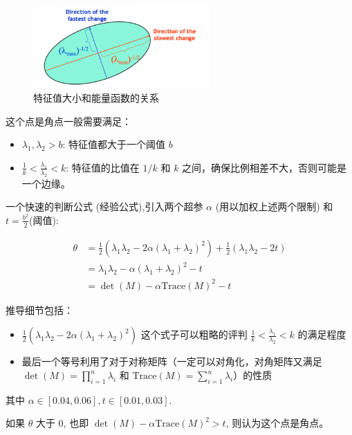 \newpage

\begin{figure}[htbp]
    \centering
    \includegraphics[width=0.6\textwidth]{figures/corner_energy.png}
    \caption{特征值大小和能量函数的关系}
\end{figure}

\begin{proposition}

这个点是角点一般需要满足：

\begin{itemize}
    \item $\lambda_1, \lambda_2>b$: 特征值都大于一个阈值 $b$
    \item $\frac{1}{k}<\frac{\lambda_1}{\lambda_2}<k$: 特征值的比值在 $1/k$ 和 $k$ 之间，确保比例相差不大，否则可能是一个边缘。
\end{itemize}

一个快速的判断公式 (经验公式),引入两个超参 $\alpha$ (用以加权上述两个限制) 和 $t = \frac{b^2}{2}$(阈值):

\begin{equation}
\begin{aligned}
\theta&=\frac 12(\lambda_1\lambda_2-2\alpha(\lambda_1+\lambda_2)^2)+\frac12(\lambda_1\lambda_2-2t)\\
&=\lambda_1\lambda_2-\alpha(\lambda_1+\lambda_2)^2-t\\
&=\det(M)-\alpha\text{Trace}(M)^2-t
\end{aligned}
\end{equation}

推导细节包括：

\begin{itemize}
    \item $\frac 12(\lambda_1\lambda_2-2\alpha(\lambda_1+\lambda_2)^2)$ 这个式子可以粗略的评判 $\frac{1}{k}<\frac{\lambda_1}{\lambda_2}<k$ 的满足程度
    \item 最后一个等号利用了对于对称矩阵（一定可以对角化，对角矩阵又满足 $\det(M) = \prod_{i=1}^n \lambda_i$ 和 $\text{Trace}(M) = \sum_{i=1}^n \lambda_i$）的性质
\end{itemize}

其中 $\alpha\in[0.04,0.06], t\in[0.01,0.03]$.

如果 $\theta$ 大于 0, 也即 $\det(M)-\alpha\text{Trace}(M)^2>t$, 则认为这个点是角点。
\end{proposition}

